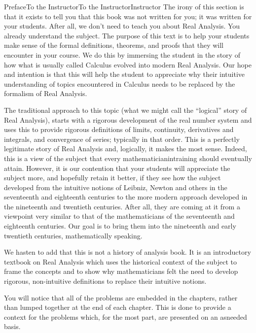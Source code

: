 \documentclass[oneside,10pt,]{book}
\numberwithin{equation}{part}
\begin{document}
%
%
\typeout{************************************************}
\typeout{************************************************}
%
\begin{preface}{Preface}{To the Instructor}{}{To the Instructor}{}{}{Instructor}
The irony of this section is that it exists to tell you that this book was not written for you; it was written for your students. After all, we don't need to teach you about Real Analysis.  You already understand the subject.  The purpose of this text is to help your students make sense of the formal definitions, theorems, and proofs that they will encounter in your course.  We do this by immersing the student in the story of how what is usually called Calculus evolved into modern Real Analysis.  Our hope and intention is that this will help the student to appreciate why their intuitive understanding of topics encountered in Calculus needs to be replaced by the formalism of Real Analysis.%
\par
The traditional approach to this topic (what we might call the ``logical'' story of Real Analysis), starts with a rigorous development of the real number system and uses this to provide rigorous definitions of limits, continuity, derivatives and integrals, and convergence of series; typically in that order. This is a perfectly legitimate story of Real Analysis and, logically, it makes the most sense.  Indeed, this is a view of the subject that every mathematician\textendash{}in\textendash{}training should eventually attain.  However, it is our contention that your students will appreciate the subject more, and hopefully retain it better, if they see how the subject developed from the intuitive notions of Leibniz, Newton and others in the seventeenth and eighteenth centuries to the more modern approach developed in the nineteenth and twentieth centuries.  After all, they are coming at it from a viewpoint very similar to that of the mathematicians of the seventeenth and eighteenth centuries.  Our goal is to bring them into the nineteenth and early twentieth centuries, mathematically speaking.%
\par
We hasten to add that this is not a history of analysis book.  It is an introductory textbook on Real Analysis which uses the historical context of the subject to frame the concepts and to show why mathematicians felt the need to develop rigorous, non-intuitive definitions to replace their intuitive notions.%
\par
You will notice that all of the problems are embedded in the chapters, rather than lumped together at the end of each chapter. This is done to provide a context for the problems which, for the most part, are presented on an as\textendash{}needed basis.%

\end{preface}
\end{document}
